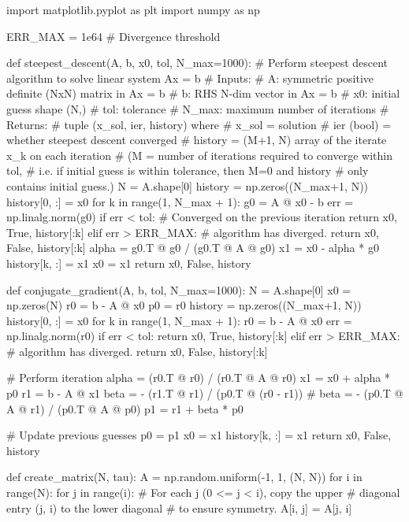 \documentclass{homework}
\begin{document}
\begin{python}
import matplotlib.pyplot as plt
import numpy as np

ERR_MAX = 1e64  # Divergence threshold

def steepest_descent(A, b, x0, tol, N_max=1000):
    # Perform steepest descent algorithm to solve linear system Ax = b
    # Inputs:
    #  A: symmetric positive definite (NxN) matrix in Ax = b
    #  b: RHS N-dim vector in Ax = b #  x0: initial guess shape (N,)
    #  tol: tolerance
    # N_max: maximum number of iterations
    # Returns:
    #   tuple (x_sol, ier, history) where
    #  x_sol = solution
    #  ier (bool) = whether steepest descent converged
    #  history = (M+1, N) array of the iterate x_k on each iteration
    #       (M = number of iterations required to converge within tol,
    #        i.e. if initial guess is within tolerance, then M=0 and history
    #        only contains initial guess.)
    N = A.shape[0]
    history = np.zeros((N_max+1, N))
    history[0, :] = x0
    for k in range(1, N_max + 1):
        g0 = A @ x0 - b
        err = np.linalg.norm(g0)
        if err < tol:
            # Converged on the previous iteration
            return x0, True, history[:k]
        elif err > ERR_MAX:
            # algorithm has diverged.
            return x0, False, history[:k]
        alpha = g0.T @ g0 / (g0.T @ A @ g0)
        x1 = x0 - alpha * g0
        history[k, :] = x1
        x0 = x1
    return x0, False, history


def conjugate_gradient(A, b, tol, N_max=1000):
    N = A.shape[0]
    x0 = np.zeros(N)
    r0 = b - A @ x0
    p0 = r0
    history = np.zeros((N_max+1, N))
    history[0, :] = x0
    for k in range(1, N_max + 1):
        r0 = b - A @ x0
        err = np.linalg.norm(r0)
        if err < tol:
            return x0, True, history[:k]
        elif err > ERR_MAX:
            # algorithm has diverged.
            return x0, False, history[:k]

        # Perform iteration
        alpha = (r0.T @ r0) / (r0.T @ A @ r0)
        x1 = x0 + alpha * p0
        r1 = b - A @ x1
        beta = - (r1.T @ r1) / (p0.T @ (r0 - r1))
        # beta = - (p0.T @ A @ r1) / (p0.T @ A @ p0)
        p1 = r1 + beta * p0

        # Update previous guesses
        p0 = p1
        x0 = x1
        history[k, :] = x1
    return x0, False, history


def create_matrix(N, tau):
    A = np.random.uniform(-1, 1, (N, N))
    for i in range(N):
        for j in range(i):
            # For each j (0 <= j < i), copy the upper
            # diagonal entry (j, i) to the lower diagonal
            # to ensure symmetry.
            A[i, j] = A[j, i]


\end{python}
\end{document}
